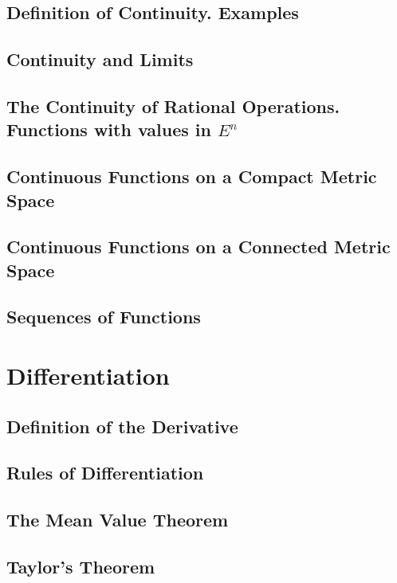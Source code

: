 \documentclass{article}
\begin{document}
		\subsection{Definition of Continuity. Examples}
		
		\subsection{Continuity and Limits}
		
		\subsection{The Continuity of Rational Operations. Functions with values in $E^n$}
		
		\subsection{Continuous Functions on a Compact Metric Space}
		
		\subsection{Continuous Functions on a Connected Metric Space}
		
		\subsection{Sequences of Functions}
	
	\section{Differentiation}
		\subsection{Definition of the Derivative}
		
		\subsection{Rules of Differentiation}		
		
		\subsection{The Mean Value Theorem}
		
		\subsection{Taylor's Theorem}	
	
\end{document}
